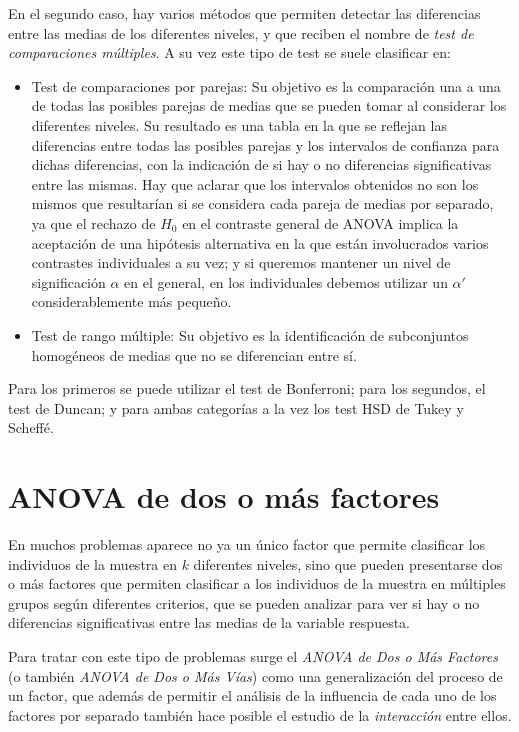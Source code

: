 \documentclass[
  spanish,
  a4paper,
]{scrreport}
\theoremstyle{plain}
\theoremstyle{definition}
\theoremstyle{definition}
\theoremstyle{remark}
\begin{document}
En el segundo caso, hay varios métodos que permiten detectar las
diferencias entre las medias de los diferentes niveles, y que reciben el
nombre de \emph{test de comparaciones múltiples}. A su vez este tipo de
test se suele clasificar en:

\begin{itemize}
\item
  Test de comparaciones por parejas: Su objetivo es la comparación una a
  una de todas las posibles parejas de medias que se pueden tomar al
  considerar los diferentes niveles. Su resultado es una tabla en la que
  se reflejan las diferencias entre todas las posibles parejas y los
  intervalos de confianza para dichas diferencias, con la indicación de
  si hay o no diferencias significativas entre las mismas. Hay que
  aclarar que los intervalos obtenidos no son los mismos que resultarían
  si se considera cada pareja de medias por separado, ya que el rechazo
  de \(H_0\) en el contraste general de ANOVA implica la aceptación de
  una hipótesis alternativa en la que están involucrados varios
  contrastes individuales a su vez; y si queremos mantener un nivel de
  significación \(\alpha\) en el general, en los individuales debemos
  utilizar un \(\alpha'\) considerablemente más pequeño.
\item
  Test de rango múltiple: Su objetivo es la identificación de
  subconjuntos homogéneos de medias que no se diferencian entre sí.
\end{itemize}

Para los primeros se puede utilizar el test de Bonferroni; para los
segundos, el test de Duncan; y para ambas categorías a la vez los test
HSD de Tukey y Scheffé.

\section{ANOVA de dos o más
factores}\label{anova-de-dos-o-muxe1s-factores}

En muchos problemas aparece no ya un único factor que permite clasificar
los individuos de la muestra en \(k\) diferentes niveles, sino que
pueden presentarse dos o más factores que permiten clasificar a los
individuos de la muestra en múltiples grupos según diferentes criterios,
que se pueden analizar para ver si hay o no diferencias significativas
entre las medias de la variable respuesta.

Para tratar con este tipo de problemas surge el \emph{ANOVA de Dos o Más
Factores} (o también \emph{ANOVA de Dos o Más Vías}) como una
generalización del proceso de un factor, que además de permitir el
análisis de la influencia de cada uno de los factores por separado
también hace posible el estudio de la \emph{interacción} entre ellos.
\end{document}
